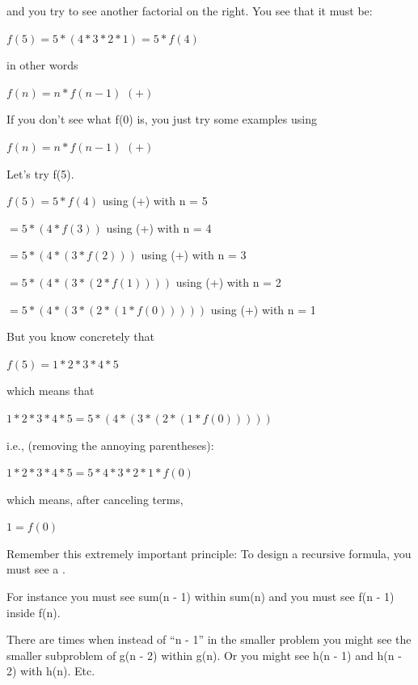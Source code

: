 and you try to see another factorial on the right. You see that it must
be:

$f(5) = 5 * (4 * 3 * 2 * 1) = 5 * f(4)$

in other words

$f(n) = n * f(n - 1)$ \hspace{1cm} $(+)$

If you don't see what f(0) is, you just try some
examples using

$f(n) = n * f(n - 1)$ \hspace{1cm} $(+)$

Let's try f(5).

$f(5) = 5 * f(4)$ using (+) with n = 5

$= 5 * (4 * f(3))$ using (+) with n = 4

$= 5 * (4 * (3 * f(2)))$ using (+) with n = 3

$= 5 * (4 * (3 * (2 * f(1))))$ using (+) with n = 2

$= 5 * (4 * (3 * (2 * (1 * f(0)))))$ using (+) with n = 1

But you know concretely that

$f(5) = 1 * 2 * 3 * 4 * 5$

which means that

$1 * 2 * 3 * 4 * 5 = 5 * (4 * (3 * (2 * (1 * f(0)))))$

i.e., (removing the annoying parentheses):

$1 * 2 * 3 * 4 * 5 = 5 * 4 * 3 * 2 * 1 * f(0)$

which means, after canceling terms,

$1 = f(0)$

Remember this extremely important principle: To design a recursive
formula, you must see a .

For instance you must see sum(n - 1) within sum(n) and you must see f(n - 1) inside f(n).

There are times when instead of ``n - 1'' in the smaller problem you
might see the smaller subproblem of g(n - 2) within g(n). Or you might
see h(n - 1) and h(n - 2) with h(n). Etc.


